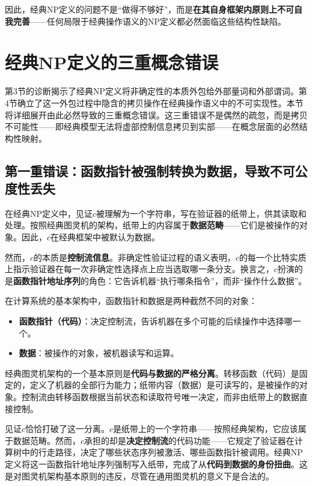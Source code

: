 \documentclass{ctexart}
\begin{document}
	因此，经典NP定义的问题不是``做得不够好''，而是\textbf{在其自身框架内原则上不可自我完善}——任何局限于经典操作语义的NP定义都必然面临这些结构性缺陷。
	
	\section{经典NP定义的三重概念错误}
	
	第3节的诊断揭示了经典NP定义将非确定性的本质外包给外部量词和外部谓词。第4节确立了这一外包过程中隐含的拷贝操作在经典操作语义中的不可实现性。本节将详细展开由此必然导致的三重概念错误。这三重错误不是偶然的疏忽，而是拷贝不可能性——即经典模型无法将虚部控制信息拷贝到实部——在概念层面的必然结构性映射。
	
	\subsection{第一重错误：函数指针被强制转换为数据，导致不可公度性丢失}
	
	在经典NP定义中，见证$c$被理解为一个字符串，写在验证器的纸带上，供其读取和处理。按照经典图灵机的架构，纸带上的内容属于\textbf{数据范畴}——它们是被操作的对象。因此，$c$在经典框架中被默认为数据。
	
	然而，$c$的本质是\textbf{控制流信息}。非确定性验证过程的语义表明，$c$的每一个比特实质上指示验证器在每一次非确定性选择点上应当选取哪一条分支。换言之，$c$扮演的是\textbf{函数指针地址序列}的角色：它告诉机器``执行哪条指令''，而非``操作什么数据''。
	
	在计算系统的基本架构中，函数指针和数据是两种截然不同的对象：
	\begin{itemize}
		\item \textbf{函数指针（代码）}：决定控制流，告诉机器在多个可能的后续操作中选择哪一个。
		\item \textbf{数据}：被操作的对象，被机器读写和运算。
	\end{itemize}
	
	经典图灵机架构的一个基本原则是\textbf{代码与数据的严格分离}。转移函数（代码）是固定的，定义了机器的全部行为能力；纸带内容（数据）是可读写的，是被操作的对象。控制流由转移函数根据当前状态和读取符号唯一决定，而非由纸带上的数据直接控制。
	
	见证$c$恰恰打破了这一分离。$c$是纸带上的一个字符串——按照经典架构，它应该属于数据范畴。然而，$c$承担的却是\textbf{决定控制流}的代码功能——它规定了验证器在计算树中的行走路径，决定了哪些状态序列被激活、哪些函数指针被调用。经典NP定义将这一函数指针地址序列强制写入纸带，完成了从\textbf{代码到数据的身份扭曲}。这是对图灵机架构基本原则的违反，尽管在通用图灵机的意义下是合法的。
	
\end{document}
